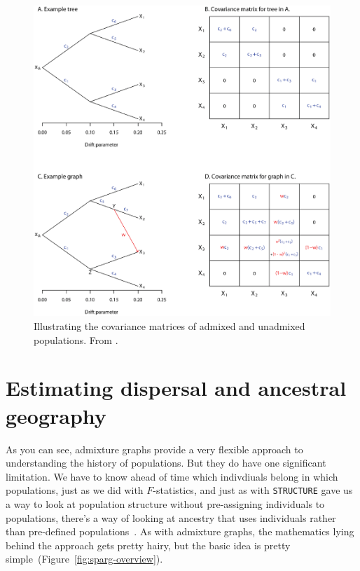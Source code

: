 \documentclass[12pt]{article}
\begin{document}
\begin{figure}
  \begin{center}
    \includegraphics[width=14cm]{treemix-figure.eps}
  \end{center}
  \caption{Illustrating the covariance matrices of admixed and
    unadmixed populations. From \cite{Pickrell-Pritchard-2012}.}\label{fig:treemix-figure}
\end{figure}

\section*{Estimating dispersal and ancestral
  geography}

As you can see, admixture graphs provide a very flexible approach to
understanding the history of populations. But they do have one
significant limitation. We have to know ahead of time which
indivdiuals belong in which populations, just as we did with
$F$-statistics, and just as with
{\tt STRUCTURE} gave us a way to look at population structure without
pre-assigning individuals to populations, there's a way of looking at
ancestry that uses individuals rather than pre-defined
populations~\cite{Osmond-Coop-2021}. As with admixture graphs, the
mathematics lying behind the approach gets pretty hairy, but the basic
idea is pretty simple~(Figure~\ref{fig:sparg-overview}).
\end{document}
